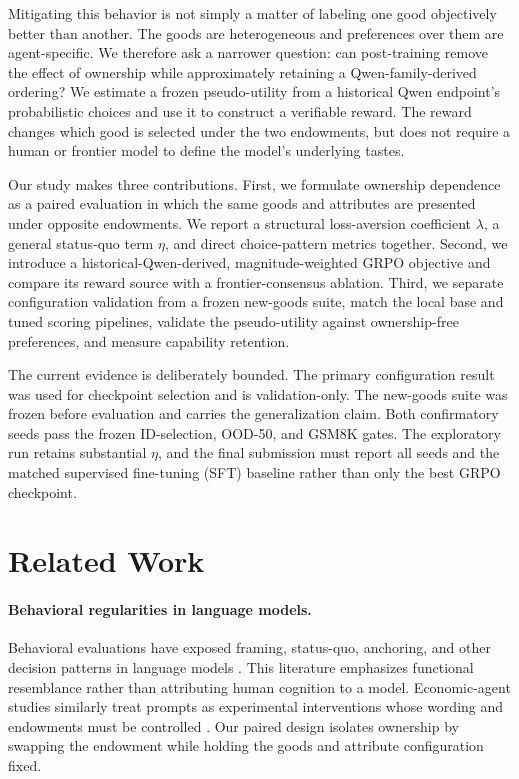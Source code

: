 \documentclass[letterpaper]{article} %
\begin{document}
Mitigating this behavior is not simply a matter of labeling one good
objectively better than another. The goods are heterogeneous and preferences
over them are agent-specific. We therefore ask a narrower question: can
post-training remove the effect of ownership while approximately retaining a
Qwen-family-derived ordering? We estimate a frozen pseudo-utility from a
historical Qwen endpoint's probabilistic choices and use it to construct a
verifiable reward. The reward
changes which good is selected under the two endowments, but does not require a
human or frontier model to define the model's underlying tastes.

Our study makes three contributions. First, we formulate ownership dependence
as a paired evaluation in which the same goods and attributes are presented
under opposite endowments. We report a structural loss-aversion coefficient
$\lambda$, a general status-quo term $\eta$, and direct choice-pattern metrics
together. Second, we introduce a historical-Qwen-derived, magnitude-weighted GRPO
objective and compare its reward source with a frontier-consensus ablation.
Third, we separate configuration validation from a frozen new-goods suite,
match the local base and tuned scoring pipelines, validate the pseudo-utility
against ownership-free preferences, and measure capability retention.

The current evidence is deliberately bounded. The primary configuration result
was used for checkpoint selection and is validation-only. The new-goods suite
was frozen before evaluation and carries the generalization claim. Both
confirmatory seeds pass the frozen ID-selection, OOD-50, and GSM8K gates. The
exploratory run retains substantial $\eta$, and the final submission must
report all seeds and the matched supervised fine-tuning (SFT) baseline rather
than only the best GRPO checkpoint.

\section{Related Work}

\paragraph{Behavioral regularities in language models.}
Behavioral evaluations have exposed framing, status-quo, anchoring, and other
decision patterns in language models \citep{jones2022capturing,
itzhak2024instructed, echterhoff2024cognitive}. This literature emphasizes
functional resemblance rather than attributing human cognition to a model.
Economic-agent studies similarly treat prompts as experimental interventions
whose wording and endowments must be controlled \citep{horton2023homo}. Our
paired design isolates ownership by swapping the endowment while holding the
goods and attribute configuration fixed.
\end{document}
